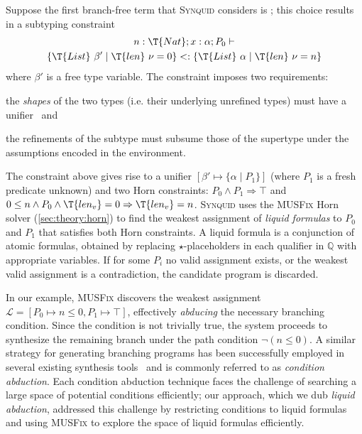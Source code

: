 \documentclass[10pt,preprint]{sigplanconf-pldi16}
\theoremstyle{definition}
\newcommand{\Implies}{\Rightarrow}
\renewcommand{\And}{\wedge}
\newcommand{\Subt}{<:}
\newcommand{\quals}{\mathbb{Q}}
\newcommand{\liquidass}{\mathcal{L}}
\newcommand{\tool}{\textsc{Synquid}\xspace}
\begin{document}
Suppose the first branch-free term that \tool considers is ;
this choice results in a subtyping constraint
\begin{multline*}
n:\T{Nat}; x:\alpha; P_0 \vdash\\ \{\T{List}\ \beta'\mid \T{len}\ \nu = 0\} \Subt \{\T{List}\ \alpha\mid \T{len}\ \nu = n\}
\end{multline*}
where $\beta'$ is a free type variable.
The constraint imposes two requirements:
\begin{inparaenum}[(i)] 
\item the \emph{shapes} of the two types (i.e. their underlying unrefined types) must have a unifier~\cite{Pierce02} and 
\item the refinements of the subtype must subsume those of the supertype under the assumptions encoded in the environment.
\end{inparaenum}
The constraint above gives rise to a unifier $[\beta'\mapsto\{\alpha\mid P_1\}]$ (where $P_1$ is a fresh predicate unknown)
and two Horn constraints: $P_0 \And P_1 \Implies \top$ and $0 \leq n \And P_0 \And \T{len _v} = 0 \Implies \T{len _v} = n$.
\tool uses the \textsc{MUSFix} Horn solver (\autoref{sec:theory:horn}) to find the weakest assignment of \emph{liquid formulas} to $P_0$ and $P_1$
that satisfies both Horn constraints.
A liquid formula is a conjunction of atomic formulas,
obtained by replacing $\star$-placeholders in each qualifier in $\quals$ with appropriate variables.
If for some $P_i$ no valid assignment exists,
or the weakest valid assignment is a contradiction,
the candidate program is discarded.

In our example, \textsc{MUSFix} discovers the weakest assignment $\liquidass = [P_0 \mapsto n \leq 0, P_1 \mapsto \top]$,
effectively \emph{abducing} the necessary branching condition.
Since the condition is not trivially true,
the system proceeds to synthesize the remaining branch under the path condition $\lnot(n \leq 0)$.
A similar strategy for generating branching programs has been successfully employed in several existing synthesis tools~\cite{LeinoMi12,KneussKuKuSu13,AlbarghouthiGuKi13,AlurCR15}
and is commonly referred to as \emph{condition abduction}.
Each condition abduction technique faces the challenge of searching a large space of potential conditions efficiently;
our approach, which we dub \emph{liquid abduction}, 
addressed this challenge by restricting conditions to liquid formulas
and using \textsc{MUSFix} to explore the space of liquid formulas efficiently.
\end{document}
